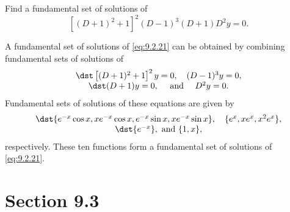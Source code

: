 \setcounter{example}{7}
\setcounter{equation}{20}
\begin{example}
  \label{example:9.2.8} \rm Find a fundamental set of solutions of
  \begin{equation}
    \label{eq:9.2.21}[(D+1)^{2}+1]^{2}(D-1)^{3}(D+1)D^{2}y=0.
  \end{equation}
\end{example}
\begin{examplesolution}
\solution A fundamental set of solutions of \eqref{eq:9.2.21} can be obtained by combining
fundamental sets of solutions of
\[
  \begin{array}{c}
    \dst\left[(D+1)^{2}+1\right]^{2}y=0,\quad(D-1)^{3}y=0, \\
    \dst(D+1)y=0,\quad\mbox{ and }\quad D^{2}y=0.
  \end{array}
\]
Fundamental sets of solutions of these equations are given by
\[
  \begin{array}{c}
    \dst\{e^{-x}\cos x,xe^{-x}\cos x,e^{-x}\sin x,xe^{-x}\sin x\},\quad\{e^{x},xe^{x},x^{2}e^{x}\}, \\
    \dst\{e^{-x}\},\mbox{ and }\{1,x\},
  \end{array}
\]
respectively. These ten functions form a fundamental set of solutions of \eqref{eq:9.2.21}.
\end{examplesolution}

\section*{Section 9.3}
\setcounter{chapter}{9}
\setcounter{section}{3}

